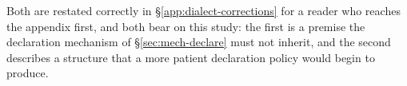 Both are restated correctly in \S\ref{app:dialect-corrections} for a reader who
reaches the appendix first, and both bear on this study: the first is a premise
the declaration mechanism of \S\ref{sec:mech-declare} must not inherit, and the
second describes a structure that a more patient declaration policy would begin
to produce.
